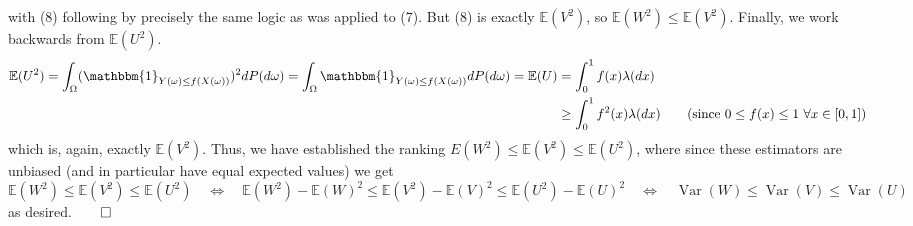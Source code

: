 \documentclass[10pt]{article}
\newcommand{\E}{\mathbb{E}}
\newcommand{\1}[1]{\mathbbm{1}_{#1}}
\DeclareMathOperator{\Var}{Var}
\begin{document}
    with (8) following by precisely the same logic as was applied to (7). But (8) is exactly $\E(V^2)$, so $\E(W^2)\leq\E(V^2)$. Finally, we work backwards from $\E(U^2)$.
    \begin{align*}
        \E(U^2)=\int_\Omega(\1{Y(\omega)\leq f(X(\omega))})^2dP(d\omega)=\int_\Omega\1{Y(\omega)\leq f(X(\omega))}dP(d\omega)=\E(U)&=\int_0^1f(x)\lambda(dx)\\
        &\geq\int_0^1f^2(x)\lambda(dx)\tag{since $0\leq f(x)\leq 1$ $\forall x\in[0,1]$}
    \end{align*}
    which is, again, exactly $\E(V^2)$. Thus, we have established the ranking $E(W^2)\leq\E(V^2)\leq\E(U^2)$, where since these estimators are unbiased (and in particular have equal expected values) we get
    \[\E(W^2)\leq\E(V^2)\leq\E(U^2)\quad\Leftrightarrow\quad \E(W^2)-\E(W)^2\leq \E(V^2)-\E(V)^2\leq\E(U^2)-\E(U)^2\quad\Leftrightarrow\quad\Var(W)\leq\Var(V)\leq\Var(U)\]
    as desired.\hfill{$\qed$}\\[5pt]
\end{document}
